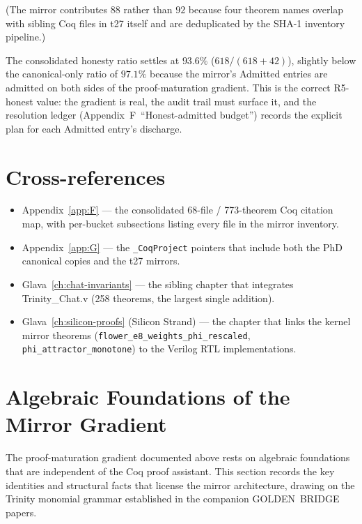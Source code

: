 (The mirror contributes $88$ rather than $92$ because four theorem
names overlap with sibling Coq files in t27 itself and are deduplicated
by the SHA-1 inventory pipeline.)

The consolidated honesty ratio settles at $93.6\%$ ($618 / (618+42)$),
slightly below the canonical-only ratio of $97.1\%$ because the
mirror's Admitted entries are admitted on both sides of the
proof-maturation gradient. This is the correct R5-honest value: the
gradient is real, the audit trail must surface it, and the resolution
ledger (Appendix~F~``Honest-admitted budget'') records the explicit
plan for each Admitted entry's discharge.

\section{Cross-references}
\label{sec:ext:xref}

\begin{itemize}
  \item Appendix~\ref{app:F} --- the consolidated 68-file / 773-theorem
        Coq citation map, with per-bucket subsections listing every
        file in the mirror inventory.
  \item Appendix~\ref{app:G} --- the
        \texttt{\_CoqProject} pointers that include both the PhD
        canonical copies and the t27 mirrors.
  \item Glava~\ref{ch:chat-invariants} --- the sibling chapter that
        integrates Trinity\_Chat.v (258 theorems, the largest single
        addition).
  \item Glava~\ref{ch:silicon-proofs} (Silicon Strand) --- the chapter
        that links the kernel mirror theorems
        (\texttt{flower\_e8\_weights\_phi\_rescaled},
        \texttt{phi\_attractor\_monotone}) to the Verilog RTL
        implementations.
\end{itemize}

\section{Algebraic Foundations of the Mirror Gradient}
\label{sec:ext:algebraic}

The proof-maturation gradient documented above rests on algebraic
foundations that are independent of the Coq proof assistant. This
section records the key identities and structural facts that license
the mirror architecture, drawing on the Trinity monomial grammar
established in the companion GOLDEN~BRIDGE papers.

